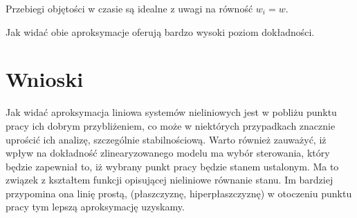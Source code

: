 \documentclass[12pt]{article}
\begin{document}
Przebiegi objętości w czasie są idealne z uwagi na równość $w_i=w$.

Jak widać obie aproksymacje oferują bardzo wysoki poziom dokładności.

\section{Wnioski}

Jak widać aproksymacja liniowa systemów nieliniowych jest w pobliżu punktu pracy
ich dobrym przybliżeniem, co może w niektórych przypadkach znacznie uprościć ich
analizę, szczególnie stabilnościową. Warto również zauważyć, iż wpływ
na dokładność zlinearyzowanego modelu ma wybór sterowania, który będzie
zapewniał to, iż wybrany punkt pracy będzie stanem ustalonym. Ma to
związek z kształtem funkcji opisującej nieliniowe równanie stanu. Im bardziej
przypomina ona linię prostą, (płaszczyznę, hiperpłaszczyznę) w otoczeniu punktu
pracy tym lepszą aproksymację uzyskamy.
\end{document}
